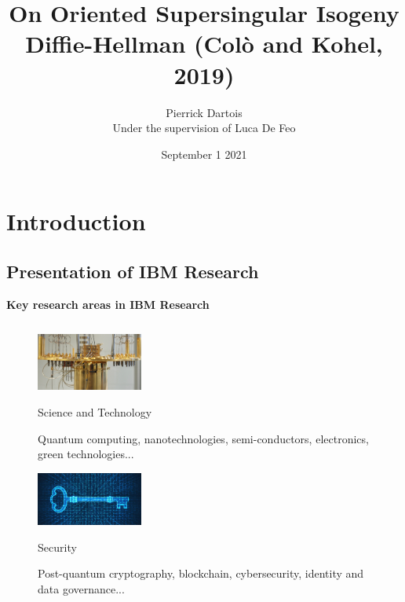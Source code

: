 \documentclass[10pt]{beamer}
\institute{IBM Research Zurich\\ Université de Rennes 1}
\title[On Oriented Supersingular Isogeny Diffie-Hellman]{On Oriented Supersingular Isogeny Diffie-Hellman (Col\`{o} and Kohel, 2019)}
\author{Pierrick Dartois \\ Under the supervision of Luca De Feo}
\date{September 1 2021}
\theoremstyle{plain}
\theoremstyle{definition}
\renewcommand{\(}{\left(}
\renewcommand{\)}{\right)}
\begin{document}
\begin{frame}
\titlepage
\end{frame}

\begin{frame}
\tableofcontents
\end{frame}

\section{Introduction}

\subsection{Presentation of IBM Research}

\begin{frame}
\textbf{Key research areas in IBM Research}

\begin{columns}[t]
\begin{figure}
\includegraphics[width=3.5cm]
{science_and_technology.png} 

Science and Technology

\vspace{0.1cm}

{ {\footnotesize Quantum computing, nanotechnologies, semi-conductors, electronics,  green technologies...}\\}
\vspace{0.3cm}


\includegraphics[width=3.5cm]
{security.jpg} 

Security

\vspace{0.1cm}

{ {\footnotesize Post-quantum cryptography, blockchain, cybersecurity, identity and data governance...}\\}


\end{figure}



\end{columns}
\end{frame}
\end{document}
